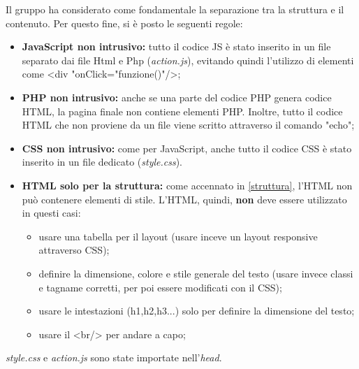 Il gruppo ha considerato come fondamentale la separazione tra la struttura e il contenuto. Per questo fine, si è posto le seguenti regole:
\begin{itemize}
    \item \textbf{JavaScript non intrusivo:} tutto il codice JS è stato inserito in un file separato dai file Html e Php (\textit{action.js}), evitando quindi l'utilizzo di elementi come <div "onClick="funzione()"/>;
    \item \textbf{PHP non intrusivo:} anche se una parte del codice PHP genera codice HTML, la pagina finale non contiene elementi PHP. Inoltre, tutto il codice HTML che non proviene da un file viene scritto attraverso il comando "echo";
    \item \textbf{CSS non intrusivo:} come per JavaScript, anche tutto il codice CSS è stato inserito in un file dedicato (\textit{style.css}).
    \item \textbf{HTML solo per la struttura:} come accennato in \ref{struttura}, l'HTML non può contenere elementi di stile. L'HTML, quindi, \textbf{non} deve essere utilizzato in questi casi:
        \begin{itemize}
            \item usare una tabella per il layout (usare inceve un layout responsive attraverso CSS);
            \item definire la dimensione, colore e stile generale del testo (usare invece classi e tagname corretti, per poi essere modificati con il CSS);
            \item usare le intestazioni (h1,h2,h3...) solo per definire la dimensione del testo;
            \item usare il <br/> per andare a capo;
        \end{itemize} 
\end{itemize} 
\textit{style.css} e \textit{action.js} sono state importate nell'\textit{head}.